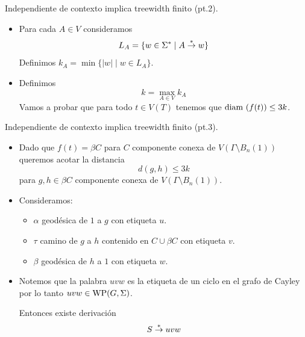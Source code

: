 \documentclass[aspectratio=169, 11pt]{beamer}
\begin{document}
	\begin{frame}[fragile]{Independiente de contexto implica treewidth finito (pt.2).}
		
		\begin{itemize}
			\item 
				Para cada $A \in V$ consideramos 
				\[
					L_{A} = \{ w \in \Sigma^{*} \mid A \overset{*}{\to} w \}
				\]
				Definimos $k_{A} = \min \{ |w| \mid w \in L_{A} \}$.
				
			\item 
				Definimos 
				\[
					k = \max_{A \in V} k_{A}	
				\]
				Vamos a probar que para todo $t \in V(T)$ tenemos que $\text{diam}\ (f(t)) \le 3k$.
		\end{itemize}
	\end{frame}

	\begin{frame}[fragile]{Independiente de contexto implica treewidth finito (pt.3).}

		\begin{itemize}
			\item
				Dado que $f(t) = \beta C$ para $C$ componente conexa de $V(\Gamma \setminus B_{n}(1))$ queremos acotar la distancia 
				\[
					d(g,h) \le 3k	
				\]
				para $g,h \in \beta C$ componente conexa de $V(\Gamma \setminus B_{n}(1))$.

			\item 
				Consideramos: 
				\begin{itemize}
					\item $\alpha$ geodésica de $1$ a $g$ con etiqueta $u$.
					\item $\tau$ camino de $g$ a $h$ contenido en $C \cup \beta C$ con etiqueta $v$.
					\item $\beta$ geodésica de $h$ a $1$ con etiqueta $w$.
				\end{itemize}
			\item 
				Notemos que la palabra 	$uvw$ es la etiqueta de un ciclo en el grafo de Cayley por lo tanto $uvw \in \text{WP}(G, \Sigma)$.
				
				Entonces existe derivación
				\[
					S \overset{*}{\to} uvw	
				\]
		\end{itemize}
	\end{frame}
\end{document}
